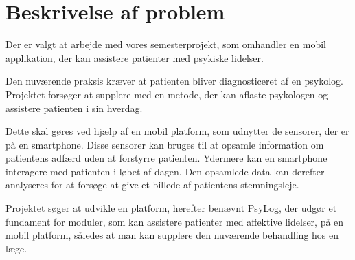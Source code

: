 \section{Beskrivelse af problem}
Der er valgt at arbejde med vores semesterprojekt, som omhandler en mobil applikation, der kan assistere patienter med psykiske lidelser.

Den nuværende praksis kræver at patienten bliver diagnosticeret af en psykolog.
Projektet forsøger at supplere med en metode, der kan aflaste psykologen og assistere patienten i sin hverdag.

Dette skal gøres ved hjælp af en mobil platform, som udnytter de sensorer, der er på en smartphone.
Disse sensorer kan bruges til at opsamle information om patientens adfærd uden at forstyrre patienten.
Ydermere kan en smartphone interagere med patienten i løbet af dagen. 
Den opsamlede data kan derefter analyseres for at forsøge at give et billede af patientens stemningsleje.

Projektet søger at udvikle en platform, herefter benævnt PsyLog, der udgør et fundament for moduler, som kan assistere patienter med affektive lidelser, på en mobil platform, således at man kan supplere den nuværende behandling hos en læge.